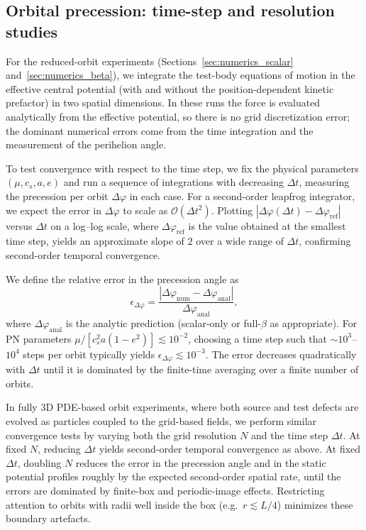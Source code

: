 \documentclass[11pt]{article}
\newcommand{\cS}{c_s}
\begin{document}
\subsection{Orbital precession: time-step and resolution studies}
\label{app:numerics_precession_convergence}

For the reduced-orbit experiments (Sections~\ref{sec:numerics_scalar} and~\ref{sec:numerics_beta}), we integrate the test-body equations of motion in the effective central potential (with and without the position-dependent kinetic prefactor) in two spatial dimensions. In these runs the force is evaluated analytically from the effective potential, so there is no grid discretization error; the dominant numerical errors come from the time integration and the measurement of the perihelion angle.

To test convergence with respect to the time step, we fix the physical parameters $(\mu,\cS,a,e)$ and run a sequence of integrations with decreasing $\Delta t$, measuring the precession per orbit $\Delta\varphi$ in each case. For a second-order leapfrog integrator, we expect the error in $\Delta\varphi$ to scale as $\mathcal{O}(\Delta t^2)$. Plotting $|\Delta\varphi(\Delta t)-\Delta\varphi_{\mathrm{ref}}|$ versus $\Delta t$ on a log–log scale, where $\Delta\varphi_{\mathrm{ref}}$ is the value obtained at the smallest time step, yields an approximate slope of $2$ over a wide range of $\Delta t$, confirming second-order temporal convergence.

We define the relative error in the precession angle as
\begin{equation}
  \epsilon_{\Delta\varphi}
  = \frac{|\Delta\varphi_{\mathrm{num}} - \Delta\varphi_{\mathrm{anal}}|}
         {\Delta\varphi_{\mathrm{anal}}},
\end{equation}
where $\Delta\varphi_{\mathrm{anal}}$ is the analytic prediction (scalar-only or full-$\beta$ as appropriate). For PN parameters $\mu/[\cS^2 a(1-e^2)] \lesssim 10^{-2}$, choosing a time step such that $\sim 10^3$--$10^4$ steps per orbit typically yields $\epsilon_{\Delta\varphi} \lesssim 10^{-3}$. The error decreases quadratically with $\Delta t$ until it is dominated by the finite-time averaging over a finite number of orbits.

In fully 3D PDE-based orbit experiments, where both source and test defects are evolved as particles coupled to the grid-based fields, we perform similar convergence tests by varying both the grid resolution $N$ and the time step $\Delta t$. At fixed $N$, reducing $\Delta t$ yields second-order temporal convergence as above. At fixed $\Delta t$, doubling $N$ reduces the error in the precession angle and in the static potential profiles roughly by the expected second-order spatial rate, until the errors are dominated by finite-box and periodic-image effects. Restricting attention to orbits with radii well inside the box (e.g.\ $r \lesssim L/4$) minimizes these boundary artefacts.
\end{document}
